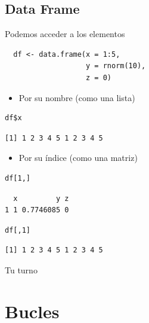 \documentclass[xcolor={usenames,svgnames,dvipsnames}]{beamer}
\begin{document}
\subsection{Data Frame}
\label{sec-3-4}
\begin{frame}[fragile,label=sec-3-4-1]{Podemos acceder a los elementos}
 \lstset{language=R,label= ,caption= ,numbers=none}
\begin{lstlisting}
  df <- data.frame(x = 1:5,
                   y = rnorm(10),
                   z = 0)
\end{lstlisting}

\begin{itemize}
\item Por su nombre (como una lista)
\end{itemize}
\lstset{language=R,label= ,caption= ,numbers=none}
\begin{lstlisting}
df$x
\end{lstlisting}

\begin{verbatim}
[1] 1 2 3 4 5 1 2 3 4 5
\end{verbatim}

\begin{itemize}
\item Por su índice (como una matriz)
\end{itemize}
\lstset{language=R,label= ,caption= ,numbers=none}
\begin{lstlisting}
df[1,]
\end{lstlisting}

\begin{verbatim}
  x         y z
1 1 0.7746085 0
\end{verbatim}

\lstset{language=R,label= ,caption= ,numbers=none}
\begin{lstlisting}
df[,1]
\end{lstlisting}

\begin{verbatim}
[1] 1 2 3 4 5 1 2 3 4 5
\end{verbatim}
\end{frame}

\begin{frame}[label=sec-3-4-2]{Tu turno}
\end{frame}
\section{Bucles}
\label{sec-4}
\end{document}
